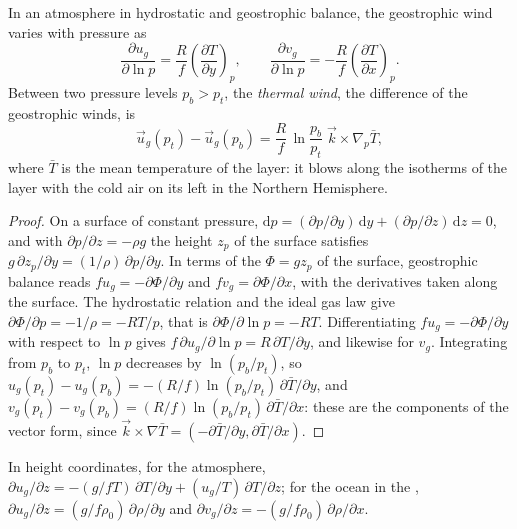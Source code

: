 \begin{theorem}\label{thm:b3:gfd-foundations:thermal-wind}
In an atmosphere in hydrostatic and geostrophic balance, the geostrophic
wind varies with pressure as
\[
\frac{\partial u_g}{\partial\ln p} = \frac{R}{f}\left(\frac{\partial T}{\partial y}\right)_p ,
\qquad
\frac{\partial v_g}{\partial\ln p} = -\frac{R}{f}\left(\frac{\partial T}{\partial x}\right)_p .
\]
Between two pressure levels $p_b > p_t$, the \emph{thermal
wind}, the difference of the geostrophic winds, is
\[
\vec u_g(p_t) - \vec u_g(p_b) = \frac{R}{f}\,\ln\frac{p_b}{p_t}\;\vec k\times\nabla_p\bar T ,
\]
where $\bar T$ is the mean temperature of the layer: it blows along the
isotherms of the layer with the cold air on its left in the Northern
Hemisphere.
\end{theorem}

\begin{proof}
On a surface of constant pressure, $\mathrm dp = (\partial p/\partial y)
\,\mathrm dy + (\partial p/\partial z)\,\mathrm dz = 0$, and with
$\partial p/\partial z = -\rho g$ the height $z_p$ of the surface satisfies
$g\,\partial z_p/\partial y = (1/\rho)\,\partial p/\partial y$. In terms of
the  $\Phi = gz_p$ of the surface, geostrophic balance reads
$fu_g = -\partial\Phi/\partial y$ and $fv_g = \partial\Phi/\partial x$, with
the derivatives taken along the surface. The hydrostatic relation and the
ideal gas law give $\partial\Phi/\partial p = -1/\rho = -RT/p$, that is
$\partial\Phi/\partial\ln p = -RT$. Differentiating $fu_g =
-\partial\Phi/\partial y$ with respect to $\ln p$ gives $f\,\partial
u_g/\partial\ln p = R\,\partial T/\partial y$, and likewise for $v_g$.
Integrating from $p_b$ to $p_t$, $\ln p$ decreases by $\ln(p_b/p_t)$, so
$u_g(p_t) - u_g(p_b) = -(R/f)\ln(p_b/p_t)\,\partial\bar T/\partial y$, and
$v_g(p_t) - v_g(p_b) = (R/f)\ln(p_b/p_t)\,\partial\bar T/\partial x$: these
are the components of the vector form, since $\vec k\times\nabla\bar T =
(-\partial\bar T/\partial y, \partial\bar T/\partial x)$.
\end{proof}

\begin{corollary}\label{cor:b3:gfd-foundations:thermal-wind-z}
In height coordinates, for the atmosphere, $\partial u_g/\partial z =
-(g/fT)\,\partial T/\partial y + (u_g/T)\,\partial T/\partial z$; for the
ocean in the , $\partial u_g/\partial z =
(g/f\rho_0)\,\partial\rho/\partial y$ and $\partial v_g/\partial z =
-(g/f\rho_0)\,\partial\rho/\partial x$.
\end{corollary}

